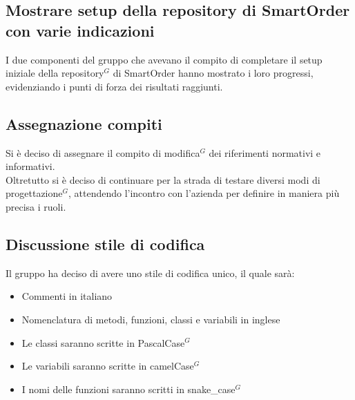 \subsection{Mostrare setup della repository di SmartOrder con varie indicazioni}
I due componenti del gruppo che avevano il compito di completare il setup iniziale della repository$^G$ di SmartOrder hanno mostrato i loro progressi, evidenziando i punti di forza dei risultati raggiunti.

\subsection{Assegnazione compiti}
Si è deciso di assegnare il compito di modifica$^G$ dei riferimenti normativi e informativi.\\
Oltretutto si è deciso di continuare per la strada di testare diversi modi di progettazione$^G$, attendendo l'incontro con l'azienda per definire in maniera più precisa i ruoli.

\subsection{Discussione stile di codifica}
Il gruppo ha deciso di avere uno stile di codifica unico, il quale sarà:
\begin{itemize}
	\item Commenti in italiano
	\item Nomenclatura di metodi, funzioni, classi e variabili in inglese
	\item Le classi saranno scritte in PascalCase$^G$
	\item Le variabili saranno scritte in camelCase$^G$
	\item I nomi delle funzioni saranno scritti in snake\_case$^G$
\end{itemize}